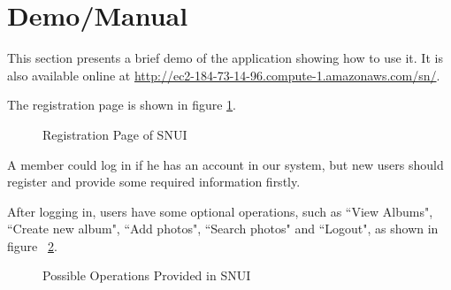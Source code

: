 \documentclass[10pt,twocolumn,letterpaper]{article}
\begin{document}
\section{Demo/Manual}
This section presents a brief demo of the application showing how to use it. It is also available online at \url{http://ec2-184-73-14-96.compute-1.amazonaws.com/sn/}.

The registration page is shown in figure \ref{fig:registration}.

\begin{figure}[t]
\begin{center}
\end{center}
\caption{Registration Page of SNUI}
\label{fig:registration}
\end{figure}

A member could log in if he has an account in our system, but new users should register and provide some required information firstly.

After logging in, users have some optional operations, such as ``View Albums", ``Create new album", ``Add photos", ``Search photos" and ``Logout", as shown in figure ~\ref{fig:operations}.

\begin{figure}[t]
\begin{center}
\end{center}
\caption{Possible Operations Provided in SNUI}
\label{fig:operations}
\end{figure}
\end{document}
